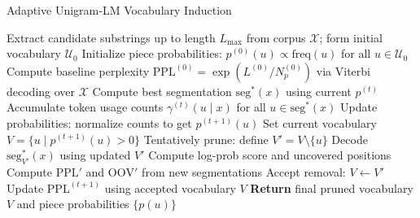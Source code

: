 \begin{algorithm}[H]
	\caption{Adaptive Unigram‐LM Vocabulary Induction}
	\label{alg:vocab-induction}
	\begin{algorithmic}[1]
		\STATE Extract candidate substrings up to length \(L_{\max}\) from corpus \(\mathcal{X}\); form initial vocabulary \(\mathcal{U}_0\)
		\STATE Initialize piece probabilities: \(p^{(0)}(u) \propto \mathrm{freq}(u)\) for all \(u \in \mathcal{U}_0\)
		\STATE Compute baseline perplexity \(\mathrm{PPL}^{(0)} = \exp(L^{(0)}/N_p^{(0)})\) via Viterbi decoding over \(\mathcal{X}\)
		\STATE Compute best segmentation \(\mathrm{seg}^{*}(x)\) using current \(p^{(t)}\)
		\STATE Accumulate token usage counts \(\gamma^{(t)}(u \mid x)\) for all \(u \in \mathrm{seg}^{*}(x)\)
		\ENDFOR
		\STATE Update probabilities: normalize counts to get \(p^{(t+1)}(u)\)
		\STATE Set current vocabulary \(V = \{u \mid p^{(t+1)}(u) > 0\}\)
		\STATE Tentatively prune: define \(V' = V \setminus \{u\}\)
		\STATE Decode \(\mathrm{seg}^{*}_{V'}(x)\) using updated \(V'\)
		\STATE Compute log-prob score and uncovered positions
		\ENDFOR
		\STATE Compute \(\mathrm{PPL}'\) and \(\mathrm{OOV}'\) from new segmentations
		\STATE Accept removal: \(V \leftarrow V'\)
		\ENDIF
		\ENDFOR
		\STATE Update \(\mathrm{PPL}^{(t+1)}\) using accepted vocabulary \(V\)
		\ENDFOR
		\STATE \textbf{Return} final pruned vocabulary \(V\) and piece probabilities \(\{p(u)\}\)
	\end{algorithmic}
\end{algorithm}